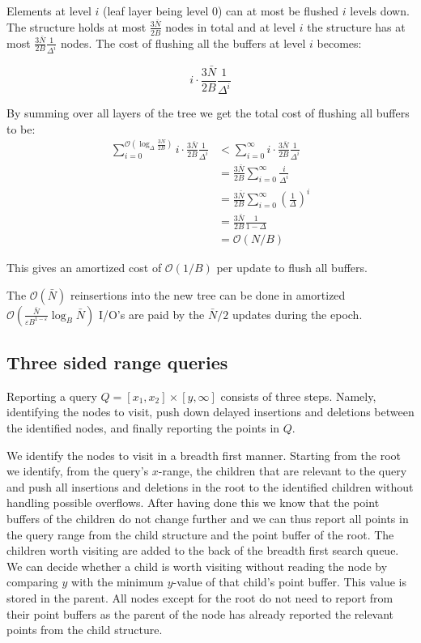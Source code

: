 \documentclass[twoside,11pt,openright]{report}
\def \epsilon {\varepsilon}
\begin{document}
Elements at level $i$ (leaf layer being level 0) can at most be flushed $i$ levels down.
The structure holds at most $\frac{3\bar{N}}{2B}$ nodes in total and at level $i$ the structure has at most $\frac{3\bar{N}}{2B} \frac{1}{\Delta^i}$ nodes. The cost of flushing all the buffers at level $i$ becomes:

$$ i \cdot \frac{3\bar{N}}{2B} \frac{1}{\Delta^i}$$

By summing over all layers of the tree we get the total cost of flushing all buffers to be:
\begin{align*}
\sum\limits_{i=0}^{\mathcal{O}(\log_\Delta \frac{3N}{2B})} i \cdot \frac{3\bar{N}}{2B} \frac{1}{\Delta^i} &< 
\sum\limits_{i=0}^{\infty} i \cdot \frac{3\bar{N}}{2B} \frac{1}{\Delta^i} \\
&= \frac{3\bar{N}}{2B} \sum\limits_{i=0}^{\infty} \frac{i}{\Delta^i} \\
&= \frac{3\bar{N}}{2B} \sum\limits_{i=0}^{\infty} \left(\frac{1}{\Delta}\right)^i \\
&= \frac{3\bar{N}}{2B} \frac{1}{1-\Delta} \\
&= \mathcal{O}(N/B)
\end{align*}

This gives an amortized cost of $\mathcal{O}(1/B)$ per update to flush all buffers.

The $\mathcal{O}(\bar{N})$ reinsertions into the new tree can be done in amortized $\mathcal{O}(\frac{\bar{N}}{\epsilon B^{1-\epsilon}} \log_B \bar{N})$ I/O's are paid by the $\bar{N}/2$ updates during the epoch.


\subsection{Three sided range queries}
\label{subsec:brodal_3_sided}
Reporting a query $Q = \left[ x_1,x_2 \right] \times \left[y, \infty \right]$ consists of three steps. Namely, identifying the nodes to visit, push down delayed insertions and deletions between the identified nodes, and finally reporting the points in $Q$.

We identify the nodes to visit in a breadth first manner.
Starting from the root we identify, from the query's $x$-range, the children that are relevant to the query and push all insertions and deletions in the root to the identified children without handling possible overflows. After having done this we know that the point buffers of the children do not change further and we can thus report all points in the query range from the child structure and the point buffer of the root. The children worth visiting are added to the back of the breadth first search queue. We can decide whether a child is worth visiting without reading the node by comparing $y$ with the minimum $y$-value of that child's point buffer. This value is stored in the parent.
All nodes except for the root do not need to report from their point buffers as the parent of the node has already reported the relevant points from the child structure.
\end{document}
